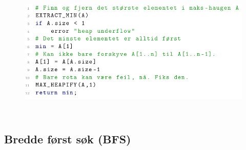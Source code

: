 \documentclass[12pt]{report}
\begin{document}
\begin{figure}[H]
	\begin{Center}
		\includegraphics[width=5.81in,height=2.54in]{./media/image182.png}
	\end{Center}
\end{figure}






\newpage
\par

\subsection*{Bredde først søk (BFS)}


\end{document}
